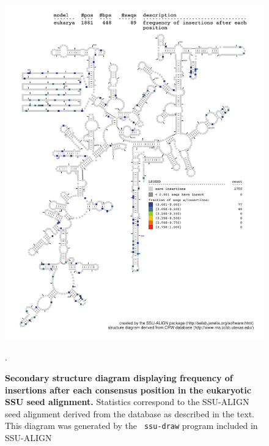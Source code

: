 \begin{figure}
\begin{center}
\includegraphics[width=5.64in]{Figures/eukarya-0p1-ifreq}
\end{center}
\caption[Secondary structure diagram displaying frequency of insertions
  after each consensus position in the eukaryotic SSU seed
  alignment]{\textbf{Secondary structure diagram displaying frequency
  of insertions after each consensus position in the eukaryotic SSU seed
  alignment.} Statistics correspond to the SSU-ALIGN seed
  alignment derived from the  database \cite{CannoneGutell02}
  as described in the text. This diagram was generated by the {\tt
  ssu-draw} program included in SSU-ALIGN}.
\label{fig:eukifreq}
\end{figure}

\newpage 

